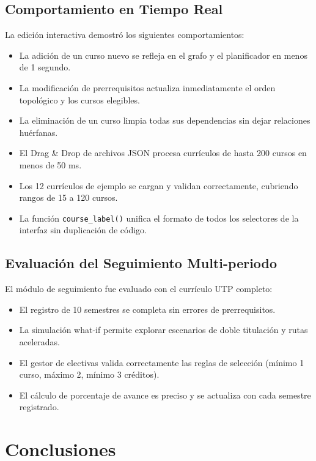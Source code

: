 \documentclass[12pt]{report}
\begin{document}
\section{Comportamiento en Tiempo Real}

La edición interactiva demostró los siguientes comportamientos:
\begin{itemize}
    \item La adición de un curso nuevo se refleja en el grafo y el planificador en menos de 1 segundo.
    \item La modificación de prerrequisitos actualiza inmediatamente el orden topológico y los cursos elegibles.
    \item La eliminación de un curso limpia todas sus dependencias sin dejar relaciones huérfanas.
    \item El Drag \& Drop de archivos JSON procesa currículos de hasta 200 cursos en menos de 50 ms.
    \item Los 12 currículos de ejemplo se cargan y validan correctamente, cubriendo rangos de 15 a 120 cursos.
    \item La función \texttt{course\_label()} unifica el formato de todos los selectores de la interfaz sin duplicación de código.
\end{itemize}

\section{Evaluación del Seguimiento Multi-periodo}

El módulo de seguimiento fue evaluado con el currículo UTP completo:
\begin{itemize}
    \item El registro de 10 semestres se completa sin errores de prerrequisitos.
    \item La simulación what-if permite explorar escenarios de doble titulación y rutas aceleradas.
    \item El gestor de electivas valida correctamente las reglas de selección (mínimo 1 curso, máximo 2, mínimo 3 créditos).
    \item El cálculo de porcentaje de avance es preciso y se actualiza con cada semestre registrado.
\end{itemize}

\chapter{Conclusiones}
\end{document}
